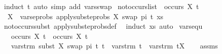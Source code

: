 \begin{isabellebody}
\ {\isacharparenleft}{\kern0pt}induct\ t{}{\isacharparenright}{\kern0pt}\ {\isacharparenleft}{\kern0pt}auto\ simp\ add{\isacharcolon}{\kern0pt}\ vars{\isacharunderscore}{\kern0pt}swap{\isacharparenright}{\kern0pt}%
\endisatagproof
{\isafoldproof}%
%
\isadelimproof
\isanewline
%
\endisadelimproof
\isanewline
{}\isamarkupfalse%
\ not{\isacharunderscore}{\kern0pt}occurs{\isacharunderscore}{\kern0pt}list{\isacharcolon}{\kern0pt}\ {\isachardoublequoteopen}{\isasymnot}\ occurs\ X\ t\ {\isasymlongrightarrow}\isanewline
\ \ X\ {\isasymnotin}\ vars{\isacharunderscore}{\kern0pt}eprobs\ {\isacharparenleft}{\kern0pt}apply{\isacharunderscore}{\kern0pt}subst{\isacharunderscore}{\kern0pt}eprobs\ {\isacharbrackleft}{\kern0pt}{\isacharparenleft}{\kern0pt}X{\isacharcomma}{\kern0pt}\ swap\ pi\ t{\isacharparenright}{\kern0pt}{\isacharbrackright}{\kern0pt}\ xs{\isacharparenright}{\kern0pt}{\isachardoublequoteclose}\isanewline
%
\isadelimproof
\ \ %
\endisadelimproof
%
\isatagproof
{}\isamarkupfalse%
\ not{\isacharunderscore}{\kern0pt}occurs{\isacharunderscore}{\kern0pt}subst\ apply{\isacharunderscore}{\kern0pt}subst{\isacharunderscore}{\kern0pt}eprobs{\isacharunderscore}{\kern0pt}def\ \isamarkupfalse%
\ {\isacharparenleft}{\kern0pt}induct\ xs{\isacharparenright}{\kern0pt}\ auto%
\endisatagproof
{\isafoldproof}%
%
\isadelimproof
\isanewline
%
\endisadelimproof
\isanewline
\isanewline
{}\isamarkupfalse%
\ vars{\isacharunderscore}{\kern0pt}equ{\isacharcolon}{\kern0pt}\ \isanewline
\ \ \ {\isachardoublequoteopen}{\isasymnot}occurs\ X\ t{}{\isachardoublequoteclose}\ \ {\isachardoublequoteopen}occurs\ X\ t{}{\isachardoublequoteclose}\isanewline
\ \ \ {\isachardoublequoteopen}vars{\isacharunderscore}{\kern0pt}trm\ {\isacharparenleft}{\kern0pt}subst\ {\isacharbrackleft}{\kern0pt}{\isacharparenleft}{\kern0pt}X{\isacharcomma}{\kern0pt}\ swap\ pi\ t{}{\isacharparenright}{\kern0pt}{\isacharbrackright}{\kern0pt}\ t{}{\isacharparenright}{\kern0pt}\ {\isacharequal}{\kern0pt}\ {\isacharparenleft}{\kern0pt}vars{\isacharunderscore}{\kern0pt}trm\ t{}\ {\isasymunion}\ vars{\isacharunderscore}{\kern0pt}trm\ t{}{\isacharparenright}{\kern0pt}{\isacharminus}{\kern0pt}{\isacharbraceleft}{\kern0pt}X{\isacharbraceright}{\kern0pt}{\isachardoublequoteclose}\isanewline
%
\isadelimproof
\ \ %
\endisadelimproof
%
\isatagproof
{}\isamarkupfalse%
\ assms\isanewline
{}\isamarkupfalse%

\end{isabellebody}
